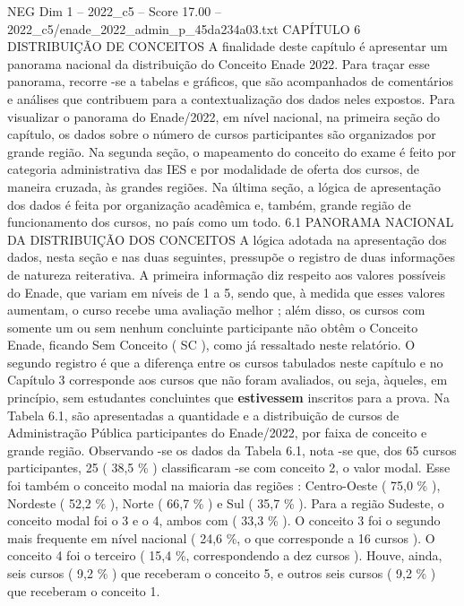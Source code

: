 \begin{textsample}{NEG Dim 1 – 2022\_c5 – Score 17.00 – 2022\_c5/enade\_2022\_admin\_p\_45da234a03.txt}  \label{ex:f1_neg_417}
CAPÍTULO 6 DISTRIBUIÇÃO DE CONCEITOS A finalidade deste capítulo é apresentar um panorama nacional da distribuição do Conceito Enade 2022.
Para traçar esse panorama, recorre -se a tabelas e gráficos, que são acompanhados de comentários e análises que contribuem para a contextualização dos dados neles expostos.
Para visualizar o panorama do Enade/2022, em nível nacional, na primeira seção do capítulo, os dados sobre o número de cursos participantes são organizados por grande região.
Na segunda seção, o mapeamento do conceito do exame é feito por categoria administrativa das IES e por modalidade de oferta dos cursos, de maneira cruzada, às grandes regiões.
Na última seção, a lógica de apresentação dos dados é feita por organização acadêmica e, também, grande região de funcionamento dos cursos, no país como um todo. 6.1 PANORAMA NACIONAL DA DISTRIBUIÇÃO DOS CONCEITOS A lógica adotada na apresentação dos dados, nesta seção e nas duas seguintes, pressupõe o registro de duas informações de natureza reiterativa.
A primeira informação diz respeito aos valores possíveis do Enade, que variam em níveis de 1 a 5, sendo que, à medida que esses valores aumentam, o curso recebe uma avaliação melhor ; além disso, os cursos com somente um ou sem nenhum concluinte participante não obtêm o Conceito Enade, ficando Sem Conceito ( SC ), como já ressaltado neste relatório.
O segundo registro é que a diferença entre os cursos tabulados neste capítulo e no Capítulo 3 corresponde aos cursos que não foram avaliados, ou seja, àqueles, em princípio, sem estudantes concluintes que \textbf{estivessem} inscritos para a prova.
Na Tabela 6.1, são apresentadas a quantidade e a distribuição de cursos de Administração Pública participantes do Enade/2022, por faixa de conceito e grande região.
Observando -se os dados da Tabela 6.1, nota -se que, dos 65 cursos participantes, 25 ( 38,5 \% ) classificaram -se com conceito 2, o valor modal.
Esse foi também o conceito modal na maioria das regiões : Centro-Oeste ( 75,0 \% ), Nordeste ( 52,2 \% ), Norte ( 66,7 \% ) e Sul ( 35,7 \% ).
Para a região Sudeste, o conceito modal foi o 3 e o 4, ambos com ( 33,3 \% ).
O conceito 3 foi o segundo mais frequente em nível nacional ( 24,6 \%, o que corresponde a 16 cursos ).
O conceito 4 foi o terceiro ( 15,4 \%, correspondendo a dez cursos ).
Houve, ainda, seis cursos ( 9,2 \% ) que receberam o conceito 5, e outros seis cursos ( 9,2 \% ) que receberam o conceito 1.

\end{textsample}
